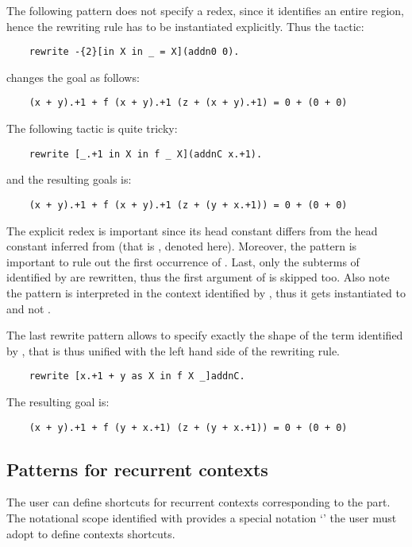 The following pattern does not specify a redex, since it
identifies an entire region, hence the rewriting rule has to be instantiated 
explicitly. Thus the tactic:
\begin{lstlisting}
    rewrite -{2}[in X in _ = X](addn0 0).
\end{lstlisting}
changes the goal as follows:
\begin{lstlisting}
    (x + y).+1 + f (x + y).+1 (z + (x + y).+1) = 0 + (0 + 0)
\end{lstlisting}
The following tactic is quite tricky:
\begin{lstlisting}
    rewrite [_.+1 in X in f _ X](addnC x.+1).
\end{lstlisting}
and the resulting goals is:
\begin{lstlisting}
    (x + y).+1 + f (x + y).+1 (z + (y + x.+1)) = 0 + (0 + 0)
\end{lstlisting}
The explicit redex  is important since its head
constant  differs from the head constant inferred from 
 (that is , denoted \C{+} here).
Moreover, the pattern  is important to rule out the first occurrence
of . Last, only the subterms of  identified by  are
rewritten, thus the first argument of  is skipped too.
Also note the pattern  is interpreted in the context
identified by , thus it gets instantiated to  and
not .

The last rewrite pattern allows to specify exactly the shape of the term
identified by , that is thus unified with the left hand side of the
rewriting rule.
\begin{lstlisting}
    rewrite [x.+1 + y as X in f X _]addnC.
\end{lstlisting}
The resulting goal is:
\begin{lstlisting}
    (x + y).+1 + f (y + x.+1) (z + (y + x.+1)) = 0 + (0 + 0)
\end{lstlisting}

\subsection{Patterns for recurrent contexts}

The user can define shortcuts for recurrent contexts corresponding to the
 part. The notational scope identified
with  provides a special notation `' the user 
must adopt to define contexts shortcuts.

